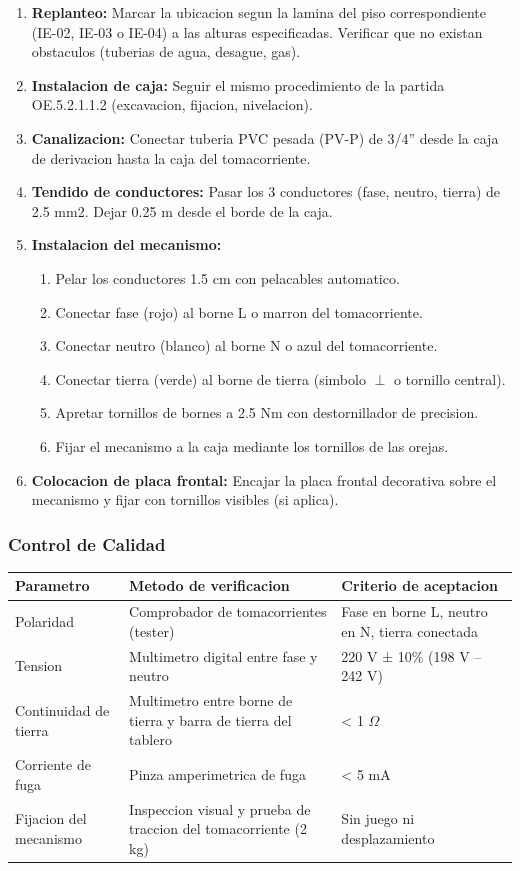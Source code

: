\begin{enumerate}
  \item \textbf{Replanteo:} Marcar la ubicacion segun la lamina del piso correspondiente (IE-02, IE-03 o IE-04) a las alturas especificadas. Verificar que no existan obstaculos (tuberias de agua, desague, gas).
  \item \textbf{Instalacion de caja:} Seguir el mismo procedimiento de la partida OE.5.2.1.1.2 (excavacion, fijacion, nivelacion).
  \item \textbf{Canalizacion:} Conectar tuberia PVC pesada (PV-P) de 3/4'' desde la caja de derivacion hasta la caja del tomacorriente.
  \item \textbf{Tendido de conductores:} Pasar los 3 conductores (fase, neutro, tierra) de 2.5 mm2. Dejar 0.25 m desde el borde de la caja.
  \item \textbf{Instalacion del mecanismo:}
  \begin{enumerate}
    \item Pelar los conductores 1.5 cm con pelacables automatico.
    \item Conectar fase (rojo) al borne L o marron del tomacorriente.
    \item Conectar neutro (blanco) al borne N o azul del tomacorriente.
    \item Conectar tierra (verde) al borne de tierra (simbolo $\perp$ o tornillo central).
    \item Apretar tornillos de bornes a 2.5 Nm con destornillador de precision.
    \item Fijar el mecanismo a la caja mediante los tornillos de las orejas.
  \end{enumerate}
  \item \textbf{Colocacion de placa frontal:} Encajar la placa frontal decorativa sobre el mecanismo y fijar con tornillos visibles (si aplica).
\end{enumerate}

\subsubsection{Control de Calidad}

\begin{longtable}{L{4.5cm} L{4.5cm} L{4.5cm}}
\toprule
\textbf{Parametro} & \textbf{Metodo de verificacion} & \textbf{Criterio de aceptacion} \\
\midrule
Polaridad & Comprobador de tomacorrientes (tester) & Fase en borne L, neutro en N, tierra conectada \\
Tension & Multimetro digital entre fase y neutro & 220 V ± 10\% (198 V -- 242 V) \\
Continuidad de tierra & Multimetro entre borne de tierra y barra de tierra del tablero & < 1 $\Omega$ \\
Corriente de fuga & Pinza amperimetrica de fuga & < 5 mA \\
Fijacion del mecanismo & Inspeccion visual y prueba de traccion del tomacorriente (2 kg) & Sin juego ni desplazamiento \\
\bottomrule
\end{longtable}

